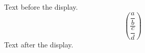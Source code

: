 \documentclass{article}
\begin{document}
Text before the display.
\[
  \left( \frac{\dfrac{a}{b}}{\dfrac{c}{d}} \right)
\]
Text after the display.
\end{document}
